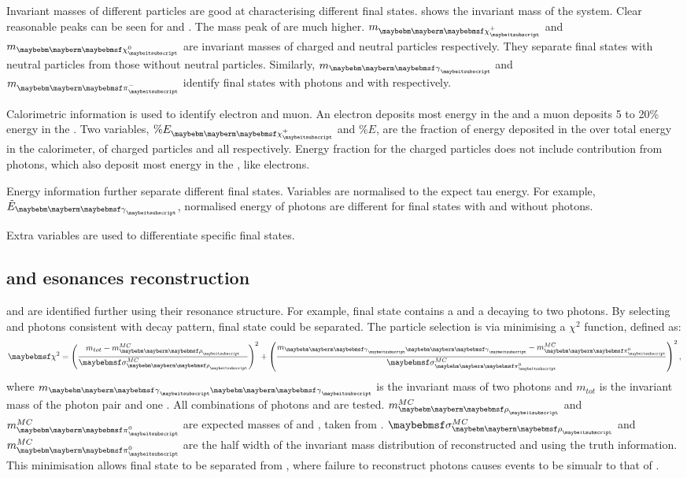 Invariant masses of different particles are good at characterising different final states.  shows the invariant mass of the system. Clear reasonable peaks can be seen for \Prho and \Pai. The mass peak of  \decayAiPionFinalStateShort are much higher. $m_{\charge}$ and $m_{\neutral}$ are invariant masses of charged and neutral particles respectively. They separate final states with neutral particles from those without neutral particles. Similarly, $m_{\Pgg}$ and $m_{\Pgpm}$ identify final states with photons and with \Pgpm respectively.

Calorimetric information is used to identify electron and muon. An electron deposits most energy in the \ECAL and a muon deposits 5 to 20\% energy in the \ECAL. Two variables, $\% E_{\charge}$ and $\% E$, are the fraction of energy deposited in the \ECAL over total energy in the calorimeter, of charged particles and all \PFOs respectively. Energy fraction for the charged particles does not include contribution from photons, which also deposit most energy in the \ECAL, like electrons.

Energy information further separate different final states. Variables are normalised to the expect tau energy. For example, $\tilde{E}_{\Pgg}$, normalised energy of photons are different for final states with and without photons.

Extra variables are used to differentiate specific final states. 

\subsection{\texorpdfstring{\decayRhoShort and \decayRhoShort}  resonances reconstruction}

\decayRhoShort and \decayAiPhotonShort are identified further using their resonance structure. For example, \decayRhoShort final state contains a \Pgpm and a \Ppizero decaying to two photons. By selecting \Pgpm and photons consistent with \Prho decay pattern, \decayRhoShort final state could be separated. The particle selection is via minimising a  $\chi^{2}$ function, defined as:
\begin{equation}
\chi^{2} = {\left(\frac{m_{tot} -  m^{MC}_{\Prho}}{\sigma^{MC}_{\Prho}}\right)}^{2} + {\left(\frac{m_{\Pphoton \Pphoton} -  m^{MC}_{\Ppizero}}{\sigma^{MC}_{\Ppizero}}\right)}^{2} \,,
\end{equation}
where $m_{\Pphoton \Pphoton}$ is the invariant mass of two photons and $m_{tot}$ is the invariant mass of the  photon pair and one \Pgpm. All combinations of photons and \Pgpm are tested. $m^{MC}_{\Prho}$ and $m^{MC}_{\Ppizero}$ are expected masses of \Prho and \Ppizero, taken from \cite{Agashe:2014kda}. $\sigma^{MC}_{\Prho}$ and $m^{MC}_{\Ppizero}$ are the half width of the invariant mass distribution of reconstructed \Prho and \Ppizero using the truth information. This minimisation allows \decayRhoShort final state to be separated from \decayAiPhotonShort, where failure to reconstruct photons causes  \decayAiPhotonShort events to be simualr to that of \decayRhoShort. 

